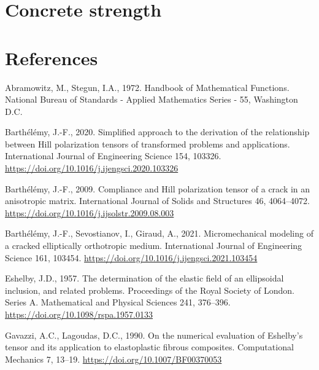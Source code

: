 \documentclass[
  letterpaper,
  DIV=11,
  numbers=noendperiod]{scrreprt}
\newlength{\cslhangindent}
\newlength{\cslentryspacingunit} %
\newenvironment{CSLReferences}[2] %
 {%
  \setlength{\parindent}{0pt}
  \ifodd #1
  \let\oldpar\par
  \def\par{\hangindent=\cslhangindent\oldpar}
  \fi
  \setlength{\parskip}{#2\cslentryspacingunit}
 }%
 {}
\begin{document}
\hypertarget{sec-concrete_strength}{%
\chapter{Concrete strength}\label{sec-concrete_strength}}


\hypertarget{references}{%
\chapter*{References}\label{references}}


\hypertarget{refs}{}
\begin{CSLReferences}{1}{0}
\leavevmode{}%
Abramowitz, M., Stegun, I.A., 1972. Handbook of {Mathematical
Functions}. {National Bureau of Standards - Applied Mathematics Series -
55}, {Washington D.C.}

\leavevmode{}%
Barthélémy, J.-F., 2020. Simplified approach to the derivation of the
relationship between {Hill} polarization tensors of transformed problems
and applications. International Journal of Engineering Science 154,
103326. \url{https://doi.org/10.1016/j.ijengsci.2020.103326}

\leavevmode{}%
Barthélémy, J.-F., 2009. Compliance and {Hill} polarization tensor of a
crack in an anisotropic matrix. International Journal of Solids and
Structures 46, 4064--4072.
\url{https://doi.org/10.1016/j.ijsolstr.2009.08.003}

\leavevmode{}%
Barthélémy, J.-F., Sevostianov, I., Giraud, A., 2021. Micromechanical
modeling of a cracked elliptically orthotropic medium. International
Journal of Engineering Science 161, 103454.
\url{https://doi.org/10.1016/j.ijengsci.2021.103454}

\leavevmode{}%
Eshelby, J.D., 1957. The determination of the elastic field of an
ellipsoidal inclusion, and related problems. Proceedings of the Royal
Society of London. Series A. Mathematical and Physical Sciences 241,
376--396. \url{https://doi.org/10.1098/rspa.1957.0133}

\leavevmode{}%
Gavazzi, A.C., Lagoudas, D.C., 1990. On the numerical evaluation of
{Eshelby}'s tensor and its application to elastoplastic fibrous
composites. Computational Mechanics 7, 13--19.
\url{https://doi.org/10.1007/BF00370053}


\end{CSLReferences}
\end{document}
